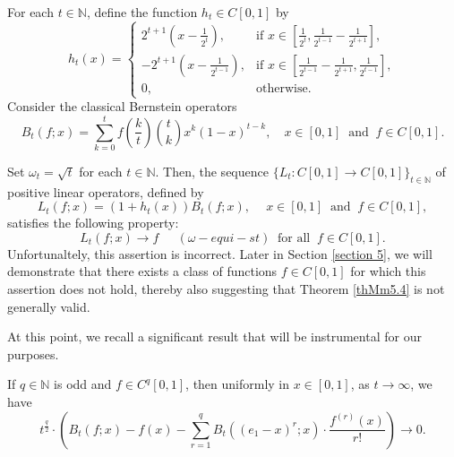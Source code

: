 \documentclass[reqno]{amsart}
\begin{document}
\begin{example}\cite[Example 2.2]{akdaug2017weighted}\label{example5.5}
	For each $t\in \mathbb{N}$, define the function $h_t \in C[0,1]$ by
	$$
	h_t(x) = 
	\begin{cases}
		\displaystyle 2^{t+1}(x - \frac{1}{2^t}), & \text{if } x \in \left[\frac{1}{2^t},  \frac{1}{2^{t-1}}-\frac{1}{2^{t+1}}\right], \\
		-2^{t+1}\left(x - \frac{1}{2^{t-1}}\right), & \text{if } x \in \left[\frac{1}{2^{t-1}}-\frac{1}{2^{t+1}}, \frac{1}{2^{t-1}}\right],\\
		0, & \text{otherwise}.
	\end{cases}
	$$
	Consider the classical Bernstein operators 
	$$
	B_t(f;x) = \sum_{k=0}^{t} f\left( \frac{k}{t} \right) \binom{t}{k} x^k (1 - x)^{t - k}, \quad x\in [0,1]~\mbox{ and }~f\in C[0,1].
	$$
	
	Set $\omega_t = \sqrt{t}$ for each $t \in\mathbb{N}$. Then, the sequence   $\{L_t : C[0,1] \to C[0,1]\}_{t \in \mathbb{N}}$ of positive linear operators, defined by
	$$
	L_t(f;x)=(1+h_t(x))B_t(f;x),~\quad x\in [0,1]~\mbox{ and }~f\in C[0,1],
	$$
	satisfies the following property:
	$$
	L_t(f;x)\to f~~\quad(\omega-equi-st )~\mbox{ for all }~f\in C[0,1].
	$$
	Unfortunaltely, this assertion is incorrect. Later in Section \ref{section 5}, we will demonstrate that  there exists a class of functions $f\in C[0,1]$ for which this assertion does not hold, thereby also suggesting that  Theorem \ref{thMm5.4} is not generally valid.
\end{example}
At this point, we recall a significant result that will be instrumental for our purposes.

\begin{theorem}\cite[Theorem 2]{tachev2012complete}\label{tachev}
	If $q \in \mathbb{N}$ is odd and $f \in C^q[0, 1]$, then uniformly in $x \in [0, 1]$, as $t \to \infty$, we have
	$$
	t^{\frac{q}{2}} \cdot \left( B_t(f; x) - f(x) - \sum_{r=1}^{q} B_t\left((e_1 - x)^r; x\right) \cdot \frac{f^{(r)}(x)}{r!} \right) \to 0.
	$$
\end{theorem}
\end{document}
